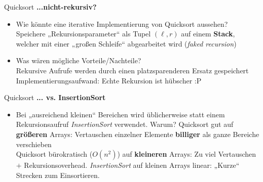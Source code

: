\begin{frame}{Quicksort}
	\textbf{...nicht-rekursiv?} \\
	\begin{itemize}
		\item Wie könnte eine iterative Implementierung von Quicksort aussehen? \\
		\pause
		\impl Speichere „Rekursionsparameter“ als Tupel $(\ell, r)$ auf einem \textbf{Stack}, welcher mit einer „großen Schleife“ abgearbeitet wird (\emph{faked recursion})
		\item Was wären mögliche Vorteile/Nachteile? \\ 
		\pause
		\Pros Rekursive Aufrufe werden durch einen platzsparenderen Ersatz gespeichert \\
		\Cons Implementierungsaufwand: Echte Rekursion ist hübscher :P
	\end{itemize}
\end{frame}

\begin{frame}{Quicksort}
	\textbf{... vs. InsertionSort} \\
	\begin{itemize}
		\item Bei „ausreichend kleinen“ Bereichen wird üblicherweise statt einem Rekursionsaufruf \emph{InsertionSort} verwendet. Warum? 
		\pause 
		\implitem \Pros Quicksort gut auf \textbf{größeren} Arrays: Vertauschen einzelner Elemente \textbf{billiger} als ganze Bereiche verschieben \\
		\Cons Quicksort bürokratisch ($O(n^2)$) auf \textbf{kleineren} Arrays: Zu viel Vertauschen $+$ Rekursionsoverhead. 
		\pause
		\implitem \emph{InsertionSort} auf kleinen Arrays linear: „Kurze“ Strecken zum Einsortieren.
	\end{itemize}
\end{frame}


